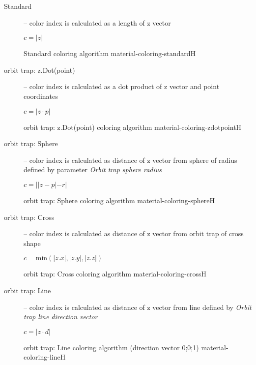 \begin{description}
	\item[Standard] -- color index is calculated as a length of z vector
	\begin{center}
		\(c = |z|\)
	\end{center}
	{Standard coloring algorithm}
	{material-coloring-standard}{H}
	
	\item[orbit trap: z.Dot(point)] -- color index is calculated as a dot product of z vector and point coordinates
	\begin{center}
		\(c = |z \cdot p|\)
	\end{center}
	{orbit trap: z.Dot(point) coloring algorithm}
	{material-coloring-zdotpoint}{H}
	
	\item[orbit trap: Sphere] -- color index is calculated as distance of z vector from sphere of radius defined by parameter \emph{Orbit trap sphere radius}
	\begin{center}
		\(c = ||z - p|-r|\)
	\end{center}
	{orbit trap: Sphere coloring algorithm}
	{material-coloring-sphere}{H}
	
	\item[orbit trap: Cross] -- color index is calculated as distance of z vector from orbit trap of cross shape
	\begin{center}
		\(c = \mathrm{min}(|z.x|, |z.y|, |z.z|)\)
	\end{center}
	{orbit trap: Cross coloring algorithm}
	{material-coloring-cross}{H}
	
	\item[orbit trap: Line] -- color index is calculated as distance of z vector from line defined by \emph{Orbit trap line direction vector}
	\begin{center}
		\(c = |z \cdot d|\)
	\end{center}
	{orbit trap: Line coloring algorithm (direction vector 0;0;1)}
	{material-coloring-line}{H}
\end{description}

